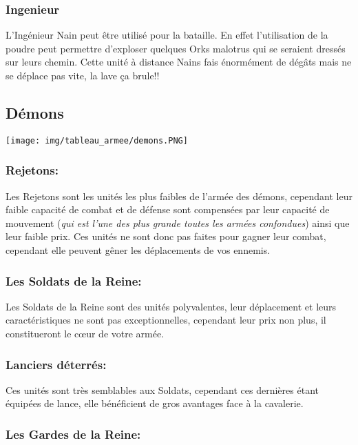\documentclass[a4paper]{article}
\begin{document}
	\subsubsection{Ingenieur}
	
	\quad L'Ingénieur Nain peut être utilisé pour la bataille. En effet l'utilisation de la poudre peut permettre d'exploser quelques Orks malotrus qui se seraient dressés sur leurs chemin. Cette unité à distance Nains fais énormément de dégâts mais ne se déplace pas vite, la lave ça brule!! 

	\newpage
\subsection{Démons}


	\texttt{[image: img/tableau\_armee/demons.PNG]}
	
	\subsubsection{Rejetons: }
	
	\quad Les Rejetons sont les unités les plus faibles de l'armée des démons, cependant leur faible capacité de combat et de défense sont compensées par leur capacité de mouvement (\textit{qui est l'une des plus grande toutes les armées confondues}) ainsi que leur faible prix. Ces unités ne sont donc pas faites pour gagner leur combat, cependant elle peuvent gêner les déplacements de vos ennemis.
	
	\subsubsection{Les Soldats de la Reine: }
	
	\quad Les Soldats de la Reine sont des unités polyvalentes, leur déplacement et leurs caractéristiques ne sont pas exceptionnelles, cependant leur prix non plus, il constitueront le cœur de votre armée.
	
	\subsubsection{Lanciers déterrés: }
	
	\quad Ces unités sont très semblables aux Soldats, cependant ces dernières étant équipées de lance, elle bénéficient de gros avantages face à la cavalerie.
	
	\subsubsection{Les Gardes de la Reine: }
	
\end{document}
